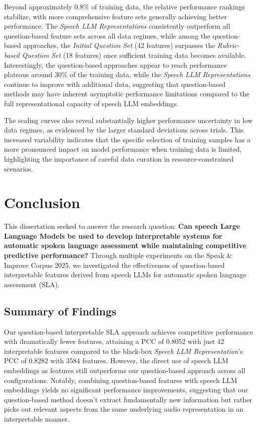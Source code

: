 \documentclass{report}
\begin{document}
Beyond approximately 0.8\% of training data, the relative performance rankings stabilize, with more comprehensive feature sets generally achieving better performance. The \emph{Speech LLM Representations} consistently outperform all question-based feature sets across all data regimes, while among the question-based approaches, the \emph{Initial Question Set} (42 features) surpasses the \emph{Rubric-based Question Set} (18 features) once sufficient training data becomes available. Interestingly, the question-based approaches appear to reach performance plateaus around 30\% of the training data, while the \emph{Speech LLM Representations} continue to improve with additional data, suggesting that question-based methods may have inherent asymptotic performance limitations compared to the full representational capacity of speech LLM embeddings.

The scaling curves also reveal substantially higher performance uncertainty in low data regimes, as evidenced by the larger standard deviations across trials. This increased variability indicates that the specific selection of training samples has a more pronounced impact on model performance when training data is limited, highlighting the importance of careful data curation in resource-constrained scenarios.

\chapter{Conclusion}
\label{chap:conclusion}
This dissertation seeked to answer the research question: \textbf{Can speech Large Language Models be used to develop interpretable systems for automatic spoken language assessment while maintaining competitive predictive performance?} Through multiple experiments on the Speak \& Improve Corpus 2025, we investigated the effectiveness of question-based interpretable features derived from speech LLMs for automatic spoken language assessment (SLA).

\section{Summary of Findings}
Our question-based interpretable SLA approach achieves competitive performance with dramatically fewer features, attaining a PCC of 0.8052 with just 42 interpretable features compared to the black-box \emph{Speech LLM Representation}'s PCC of 0.8282 with 3584 features. However, the direct use of speech LLM embeddings as features still outperforms our question-based approach across all configurations. Notably, combining question-based features with speech LLM embeddings yields no significant performance improvements, suggesting that our question-based method doesn't extract fundamentally new information but rather picks out relevant aspects from the same underlying audio representation in an interpretable manner.
\end{document}
